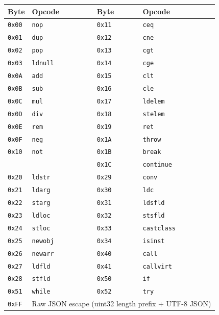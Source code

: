 \documentclass[11pt,a4paper]{article}
\newcommand{\code}[1]{\texttt{\small #1}}
\begin{document}
\begin{longtable}{llll}
  \toprule
  \textbf{Byte} & \textbf{Opcode} & \textbf{Byte} & \textbf{Opcode} \\
  \midrule
  \endhead
  \code{0x00} & \code{nop}       & \code{0x11} & \code{ceq} \\
  \code{0x01} & \code{dup}       & \code{0x12} & \code{cne} \\
  \code{0x02} & \code{pop}       & \code{0x13} & \code{cgt} \\
  \code{0x03} & \code{ldnull}    & \code{0x14} & \code{cge} \\
  \code{0x0A} & \code{add}       & \code{0x15} & \code{clt} \\
  \code{0x0B} & \code{sub}       & \code{0x16} & \code{cle} \\
  \code{0x0C} & \code{mul}       & \code{0x17} & \code{ldelem} \\
  \code{0x0D} & \code{div}       & \code{0x18} & \code{stelem} \\
  \code{0x0E} & \code{rem}       & \code{0x19} & \code{ret} \\
  \code{0x0F} & \code{neg}       & \code{0x1A} & \code{throw} \\
  \code{0x10} & \code{not}       & \code{0x1B} & \code{break} \\
              &                  & \code{0x1C} & \code{continue} \\
  \midrule
  \code{0x20} & \code{ldstr}     & \code{0x29} & \code{conv} \\
  \code{0x21} & \code{ldarg}     & \code{0x30} & \code{ldc} \\
  \code{0x22} & \code{starg}     & \code{0x31} & \code{ldsfld} \\
  \code{0x23} & \code{ldloc}     & \code{0x32} & \code{stsfld} \\
  \code{0x24} & \code{stloc}     & \code{0x33} & \code{castclass} \\
  \code{0x25} & \code{newobj}    & \code{0x34} & \code{isinst} \\
  \code{0x26} & \code{newarr}    & \code{0x40} & \code{call} \\
  \code{0x27} & \code{ldfld}     & \code{0x41} & \code{callvirt} \\
  \code{0x28} & \code{stfld}     & \code{0x50} & \code{if} \\
  \midrule
  \code{0x51} & \code{while}     & \code{0x52} & \code{try} \\
  \code{0xFF} & \multicolumn{3}{l}{Raw JSON escape (uint32 length prefix + UTF-8 JSON)} \\
  \bottomrule
\end{longtable}
\end{document}
